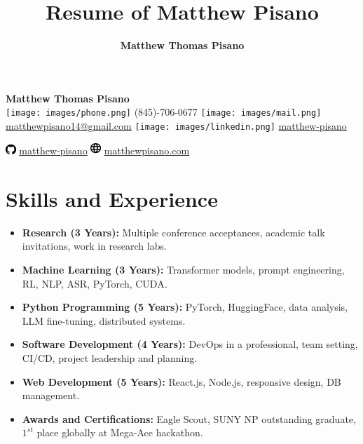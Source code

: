 \documentclass[11pt]{article}
\title{Resume of Matthew Pisano}
\author{\textbf{\LARGE Matthew Thomas Pisano}}
\date{}
\begin{document}
\pagestyle{plain}

\begin{tcolorbox}[width=\linewidth, sharp corners=all, colback=white!90!green, colframe=black]
    
    \begin{center}
        \textbf{\LARGE Matthew Thomas Pisano}\\
        \vspace{0.1in}
        \texttt{[image: images/phone.png]}
        (845)-706-0677 
        \hspace*{0.3in}
        \texttt{[image: images/mail.png]}
        \href{mailto:matthewpisano14@gmail.com}{matthewpisano14@gmail.com} 
        \hspace*{0.5in}
        \texttt{[image: images/linkedin.png]}
        \href{https://www.linkedin.com/in/matthew-pisano/}{matthew-pisano}

        \vspace{0.1in}
        \includegraphics[width=11pt,trim=0 0.4in 0 0]{images/github.png}
        \href{https://github.com/matthew-pisano}{matthew-pisano}
        \hspace*{0.5in}
        \includegraphics[width=11pt,trim=0 0.4in 0 0]{images/website.png}
        \href{https://matthewpisano.com/}{matthewpisano.com}
    \end{center}
    
\end{tcolorbox}

\vspace{0.1in}

\section*{Skills and Experience}
\begin{itemize}
    \itemsep0em
    
    \item \textbf{Research (3 Years):} Multiple conference acceptances, academic talk invitations, work in research labs.
    \item \textbf{Machine Learning (3 Years):} Transformer models, prompt engineering, RL, NLP, ASR, PyTorch, CUDA.
    \item \textbf{Python Programming (5 Years):} PyTorch, HuggingFace, data analysis, LLM fine-tuning, distributed systems.
    \item \textbf{Software Development (4 Years):} DevOps in a professional, team setting, CI/CD, project leadership and planning.
    \item \textbf{Web Development (5 Years):} React.js, Node.js, responsive design, DB management.
    \item \textbf{Awards and Certifications:} Eagle Scout, SUNY NP outstanding graduate, $1^{st}$ place globally at Mega-Ace hackathon.

\end{itemize}
\end{document}
